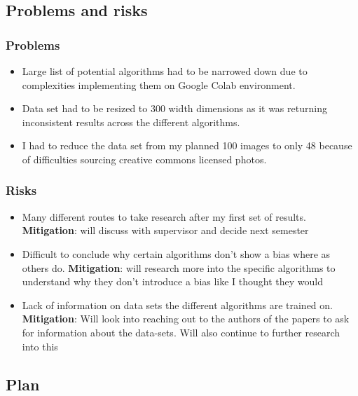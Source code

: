 \documentclass[11pt]{article}
\begin{document}
\subsection{Problems and risks}\label{problems-and-risks}

\subsubsection{Problems}\label{problems}

\begin{itemize}
\item Large list of potential algorithms had to be narrowed down due to complexities implementing them on Google Colab environment.
\item Data set had to be resized to 300 width dimensions as it was returning inconsistent results across the different algorithms.
\item I had to reduce the data set from my planned 100 images to only 48 because of difficulties sourcing creative commons licensed photos.

\end{itemize}

\subsubsection{Risks}\label{risks}

\begin{itemize}
\item Many different routes to take research after my first set of results. \textbf{Mitigation}: will discuss with supervisor and decide next semester
\item Difficult to conclude why certain algorithms don't show a bias where as others do. \textbf{Mitigation}: will research more into the specific algorithms to understand why they don't introduce a bias like I thought they would
\item  Lack of information on data sets the different algorithms are trained on. \textbf{Mitigation}: Will look into reaching out to the authors of the papers to ask for information about the data-sets. Will also continue to further research into this
\end{itemize}


\subsection{Plan}\label{plan}
\end{document}
